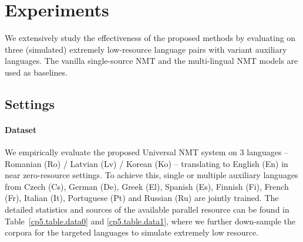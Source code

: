 

\section{Experiments}
\label{cp5.sec.exps}
We extensively study the effectiveness of the proposed methods by evaluating on three (simulated) extremely low-resource language pairs with variant auxiliary languages. The vanilla single-source NMT and the multi-lingual NMT models are used as baselines.
\subsection{Settings}

\paragraph{Dataset} We empirically evaluate the proposed Universal NMT system on $3$ languages -- Romanian (Ro) / Latvian (Lv) / Korean (Ko)  -- translating to English (En) in near zero-resource settings. To achieve this, single or multiple auxiliary languages from Czech (Cs), German (De), Greek (El), Spanish (Es), Finnish (Fi), French (Fr),  Italian (It), Portuguese (Pt) and Russian (Ru) are jointly trained. The detailed statistics and sources of the available parallel resource can be found in Table~\ref{cp5.table.data0} and \ref{cp5.table.data1}, where we further down-sample the corpora for the targeted languages to simulate extremely low resource. 

